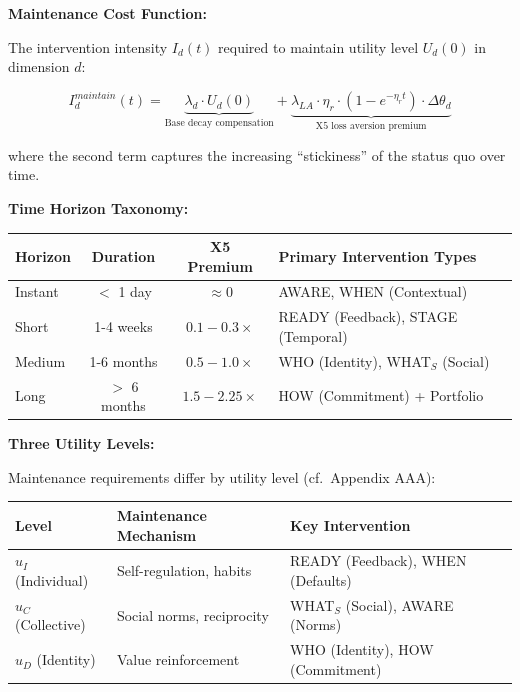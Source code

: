 \begin{tcolorbox}[colback=orange!5!white, colframe=orange!75!black,
    title=\textbf{Method UNTCM-M5: Maintenance Cost Analysis}]
\textbf{Maintenance Cost Function:}

The intervention intensity $I_d(t)$ required to maintain utility level $U_d(0)$ in dimension $d$:

\begin{equation}
I_d^{maintain}(t) = \underbrace{\lambda_d \cdot U_d(0)}_{\text{Base decay compensation}} + \underbrace{\lambda_{LA} \cdot \eta_r \cdot (1 - e^{-\eta_r t}) \cdot \Delta\theta_d}_{\text{X5 loss aversion premium}}
\label{eq:maintenance-cost}
\end{equation}

where the second term captures the increasing ``stickiness'' of the status quo over time.

\textbf{Time Horizon Taxonomy:}

\begin{center}
\renewcommand{\arraystretch}{1.3}
\begin{tabular}{@{}lccl@{}}
\toprule
\textbf{Horizon} & \textbf{Duration} & \textbf{X5 Premium} & \textbf{Primary Intervention Types} \\
\midrule
Instant & $<$ 1 day & $\approx 0$ & AWARE, WHEN (Contextual) \\
Short & 1-4 weeks & $0.1-0.3\times$ & READY (Feedback), STAGE (Temporal) \\
Medium & 1-6 months & $0.5-1.0\times$ & WHO (Identity), WHAT$_S$ (Social) \\
Long & $>$ 6 months & $1.5-2.25\times$ & HOW (Commitment) + Portfolio \\
\bottomrule
\end{tabular}
\end{center}

\textbf{Three Utility Levels:}

Maintenance requirements differ by utility level (cf.\ Appendix AAA):

\begin{center}
\renewcommand{\arraystretch}{1.3}
\begin{tabular}{@{}lll@{}}
\toprule
\textbf{Level} & \textbf{Maintenance Mechanism} & \textbf{Key Intervention} \\
\midrule
$u_I$ (Individual) & Self-regulation, habits & READY (Feedback), WHEN (Defaults) \\
$u_C$ (Collective) & Social norms, reciprocity & WHAT$_S$ (Social), AWARE (Norms) \\
$u_D$ (Identity) & Value reinforcement & WHO (Identity), HOW (Commitment) \\
\bottomrule
\end{tabular}
\end{center}


\end{tcolorbox}
